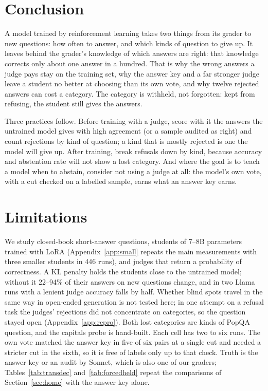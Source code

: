 \documentclass[11pt,a4paper,twocolumn]{article}
\begin{document}
\section{Conclusion}

A model trained by reinforcement learning takes two things from its grader to new questions: how often to answer, and which kinds of question to give up. It leaves behind the grader's knowledge of which answers are right: that knowledge corrects only about one answer in a hundred. That is why the wrong answers a judge pays stay on the training set, why the answer key and a far stronger judge leave a student no better at choosing than its own vote, and why twelve rejected answers can cost a category. The category is withheld, not forgotten: kept from refusing, the student still gives the answers.

Three practices follow. Before training with a judge, score with it the answers the untrained model gives with high agreement (or a sample audited as right) and count rejections by kind of question; a kind that is mostly rejected is one the model will give up. After training, break refusals down by kind, because accuracy and abstention rate will not show a lost category. And where the goal is to teach a model when to abstain, consider not using a judge at all: the model's own vote, with a cut checked on a labelled sample, earns what an answer key earns.

\section*{Limitations}

We study closed-book short-answer questions, students of 7--8B parameters trained with LoRA (Appendix~\ref{app:small} repeats the main measurements with three smaller students in 446 runs), and judges that return a probability of correctness. A KL penalty holds the students close to the untrained model; without it 22--94\% of their answers on new questions change, and in two Llama runs with a lenient judge accuracy falls by half. Whether blind spots travel in the same way in open-ended generation is not tested here; in one attempt on a refusal task the judges' rejections did not concentrate on categories, so the question stayed open (Appendix~\ref{app:repro}). Both lost categories are kinds of PopQA question, and the capitals probe is hand-built. Each cell has two to six runs. The own vote matched the answer key in five of six pairs at a single cut and needed a stricter cut in the sixth, so it is free of labels only up to that check. Truth is the answer key or an audit by Sonnet, which is also one of our graders; Tables~\ref{tab:transdec} and~\ref{tab:forcedheld} repeat the comparisons of Section~\ref{sec:home} with the answer key alone.
\end{document}
